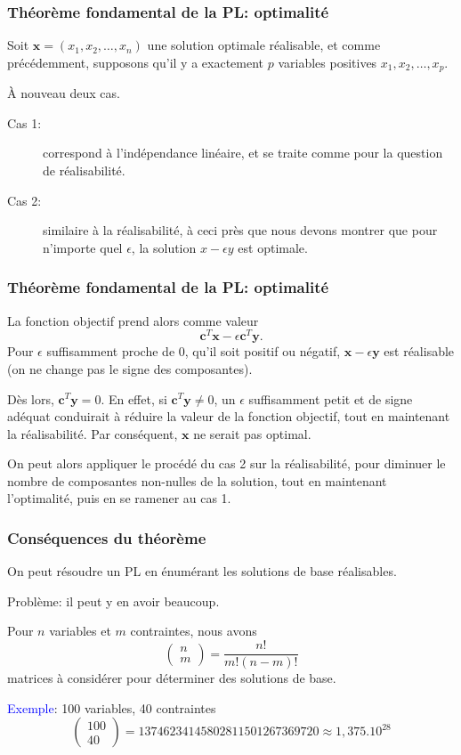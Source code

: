 \documentclass[usepdftitle=false]{beamer}
\def\bc{\boldsymbol{c}}
\def\bx{\boldsymbol{x}}
\def\by{\boldsymbol{y}}
\begin{document}
\begin{frame}
\frametitle{Théorème fondamental de la PL: optimalité}

Soit $\bx = (x_1, x_2, \ldots, x_n)$ une solution optimale réalisable, et comme précédemment, supposons qu'il y a exactement $p$ variables positives $x_1, x_2, \ldots, x_p$.

\mbox{}

À nouveau deux cas.
\begin{description}
\item[Cas 1:] correspond à l'indépendance linéaire, et se traite comme pour la question de réalisabilité.
\item[Cas 2:]
similaire à la réalisabilité, à ceci près que nous devons montrer que pour n'importe quel $\epsilon$, la solution $x-\epsilon y$ est optimale.
\end{description}

\end{frame}

\begin{frame}
\frametitle{Théorème fondamental de la PL: optimalité}

La fonction objectif prend alors comme valeur
\[
\bc^T \bx - \epsilon \bc^T\by.
\]
Pour $\epsilon$ suffisamment proche de 0, qu'il soit positif ou négatif, $\bx - \epsilon \by$ est réalisable (on ne change pas le signe des composantes).

\mbox{}

Dès lors, $\bc^T\by = 0$. En effet, si $\bc^T\by \ne 0$, un $\epsilon$ suffisamment petit et de signe adéquat conduirait à réduire la valeur de la fonction objectif, tout en maintenant la réalisabilité. Par conséquent, $\bx$ ne serait pas optimal.

\mbox{}

On peut alors appliquer le procédé du cas 2 sur la réalisabilité, pour diminuer le nombre de composantes non-nulles de la solution, tout en maintenant l'optimalité, puis en se ramener au cas 1.

\end{frame}

\begin{frame}
\frametitle{Conséquences du théorème}

On peut résoudre un PL en énumérant les solutions de base réalisables.

Problème: il peut y en avoir beaucoup.

Pour $n$ variables et $m$ contraintes, nous avons
\[
\begin{pmatrix}
n \\ m
\end{pmatrix}
= \frac{n!}{m!(n-m)!}
\]
matrices à considérer pour déterminer des solutions de base.

\mbox{}

\textcolor{blue}{Exemple}: 100 variables, 40 contraintes
\[
\begin{pmatrix}
100 \\ 40
\end{pmatrix}
= 13746234145802811501267369720 \approx 1,375.10^{28}
\]

\end{frame}
\end{document}
